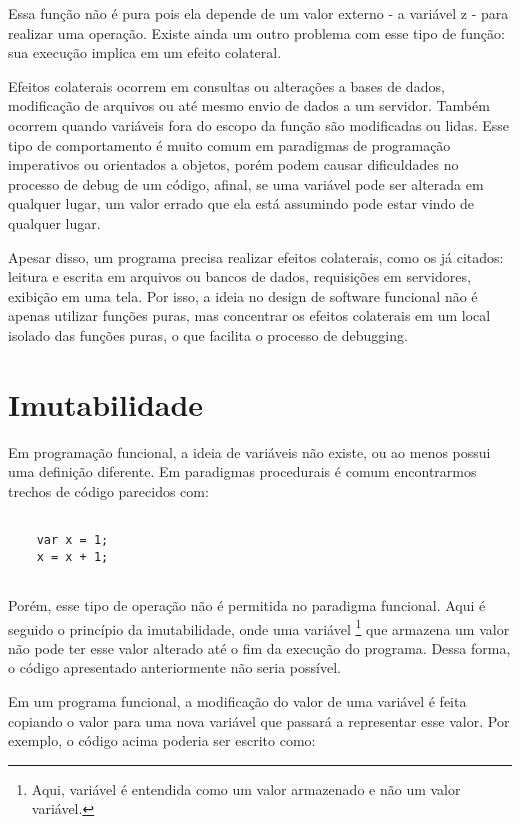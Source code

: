 Essa função não é pura pois ela depende de um 
valor externo - a variável z - para realizar 
uma operação. Existe ainda um outro problema 
com esse tipo de função: sua execução implica em 
um efeito colateral.

Efeitos colaterais ocorrem em consultas ou 
alterações a bases de dados, modificação de 
arquivos ou até mesmo envio de dados a um 
servidor.\cite{purefunctionscala} \cite{functionalscala} Também ocorrem quando variáveis fora 
do escopo da função são modificadas ou lidas. 
Esse tipo de comportamento é muito comum em 
paradigmas de programação imperativos ou 
orientados a objetos, porém 
podem causar dificuldades no processo de 
debug de um código, afinal, se uma variável 
pode ser alterada em qualquer lugar, um 
valor errado que ela está assumindo pode 
estar vindo de qualquer lugar.

Apesar disso, um programa precisa realizar 
efeitos colaterais, como os já citados: 
leitura e escrita em arquivos ou bancos de 
dados, requisições em servidores, exibição em 
uma tela. Por isso, a ideia no design de software 
funcional não é apenas utilizar funções puras, 
mas concentrar os efeitos colaterais em um local 
isolado das funções puras, o que facilita o 
processo de debugging.\cite{purefunctionscala}


\section{Imutabilidade}

Em programação funcional, a ideia de variáveis não 
existe, ou ao menos possui uma definição diferente. 
Em paradigmas procedurais é comum encontrarmos trechos 
de código parecidos com:

\begin{lstlisting}[caption={Exemplo de Código Mutável},label=mutablevar]

    var x = 1;
    x = x + 1;


\end{lstlisting}

Porém, esse tipo de operação não é permitida no 
paradigma funcional. Aqui é seguido o princípio 
da imutabilidade, onde uma variável \footnote{Aqui, 
variável é entendida como um valor armazenado 
e não um valor variável.} que armazena um valor 
não pode ter esse valor alterado até o fim da 
execução do programa. Dessa forma, 
o código apresentado anteriormente não seria 
possível.

Em um programa funcional, a modificação do valor 
de uma variável é feita copiando o valor para uma 
nova variável que passará a representar esse valor. 
Por exemplo, o código acima poderia ser escrito 
como:

